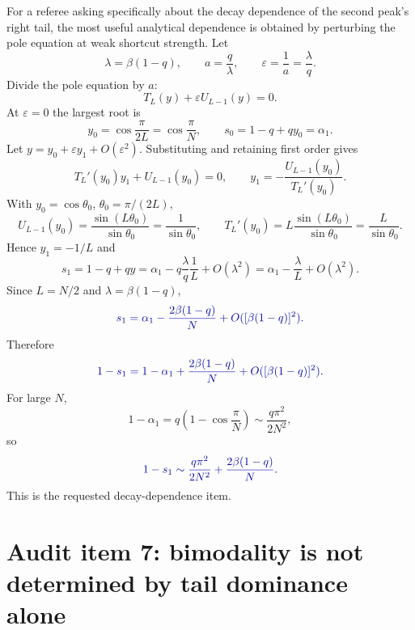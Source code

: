 \documentclass[11pt]{article}
\newcommand{\Corrected}[1]{\textcolor{blue!65!black}{#1}}
\begin{document}
For a referee asking specifically about the decay dependence of the second peak's right tail, the
most useful analytical dependence is obtained by perturbing the pole equation at weak shortcut
strength.  Let
\begin{equation}
  \lambda=\beta(1-q),
  \qquad a=\frac{q}{\lambda},
  \qquad \varepsilon=\frac{1}{a}=\frac{\lambda}{q}.
\end{equation}
Divide the pole equation by $a$:
\begin{equation}
  T_L(y)+\varepsilon U_{L-1}(y)=0.
\end{equation}
At $\varepsilon=0$ the largest root is
\begin{equation}
  y_0=\cos\frac{\pi}{2L}=\cos\frac{\pi}{N},
  \qquad
  s_0=1-q+qy_0=\alpha_1.
\end{equation}
Let $y=y_0+\varepsilon y_1+O(\varepsilon^2)$.  Substituting and retaining first order gives
\begin{equation}
  T_L'(y_0)y_1+U_{L-1}(y_0)=0,
  \qquad
  y_1=-\frac{U_{L-1}(y_0)}{T_L'(y_0)}.
\end{equation}
With $y_0=\cos\theta_0$, $\theta_0=\pi/(2L)$,
\begin{equation}
  U_{L-1}(y_0)=\frac{\sin(L\theta_0)}{\sin\theta_0}=\frac{1}{\sin\theta_0},
  \qquad
  T_L'(y_0)=L\frac{\sin(L\theta_0)}{\sin\theta_0}=\frac{L}{\sin\theta_0}.
\end{equation}
Hence $y_1=-1/L$ and
\begin{equation}
  s_1=1-q+qy=\alpha_1-q\frac{\lambda}{q}\frac{1}{L}+O(\lambda^2)
  =\alpha_1-\frac{\lambda}{L}+O(\lambda^2).
\end{equation}
Since $L=N/2$ and $\lambda=\beta(1-q)$,
\begin{equation}
  \Corrected{s_1=\alpha_1-\frac{2\beta(1-q)}{N}+O([\beta(1-q)]^2).}
\end{equation}
Therefore
\begin{equation}
  \Corrected{1-s_1=1-\alpha_1+\frac{2\beta(1-q)}{N}+O([\beta(1-q)]^2).}
\end{equation}
For large $N$,
\begin{equation}
  1-\alpha_1=q\left(1-\cos\frac{\pi}{N}\right)
  \sim \frac{q\pi^2}{2N^2},
\end{equation}
so
\begin{equation}
  \Corrected{1-s_1\sim \frac{q\pi^2}{2N^2}+\frac{2\beta(1-q)}{N}.}
\end{equation}
This is the requested decay-dependence item.

\section{Audit item 7: bimodality is not determined by tail dominance alone}
\end{document}
